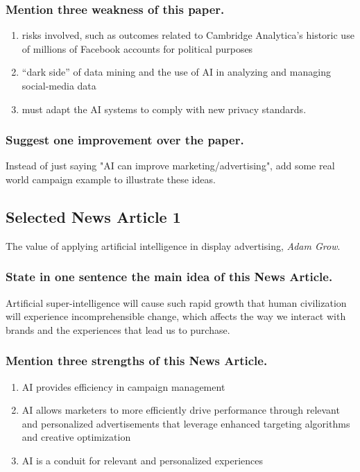 \documentclass[12pt]{article}%
\begin{document}
\subsubsection{Mention three weakness of this paper.}

\begin{enumerate}
\item risks involved, such as outcomes related to Cambridge Analytica’s historic use of millions of Facebook accounts for political purposes
\item “dark side” of data mining and the use of AI in analyzing and managing social-media data
\item must adapt the AI systems to comply with new privacy standards. 
\end{enumerate}

\subsubsection{Suggest one improvement over the paper.}

Instead of just saying "AI can improve marketing/advertising", add some real world campaign example to illustrate these ideas.


\subsection{Selected News Article 1}

The value of applying artificial intelligence in display advertising, \textit{Adam Grow}.

\subsubsection{State in one sentence the main idea of this News Article.}

Artificial super-intelligence will cause such rapid growth that human civilization will experience incomprehensible change, which affects the way we interact with brands and the experiences that lead us to purchase.

\subsubsection{Mention three strengths of this News Article.}

\begin{enumerate}
\item AI provides efficiency in campaign management
\item AI allows marketers to more efficiently drive performance through relevant and personalized advertisements that leverage enhanced targeting algorithms and creative optimization
\item AI is a conduit for relevant and personalized experiences
\end{enumerate}
\end{document}
